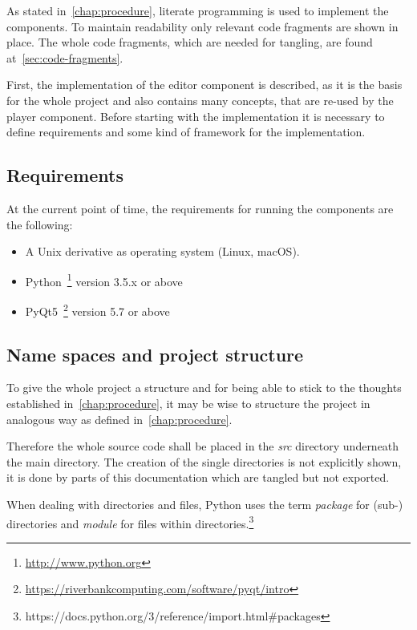 \documentclass[
    a4paper,      %
    10pt,         %
    openright,    %
    notitlepage,  %
    parskip=half, %
]{scrreprt}       %
\theoremstyle{definition}                    %
\begin{document}
As stated in~\autoref{chap:procedure}, literate programming is used to implement
the components. To maintain readability only relevant code fragments are shown
in place. The whole code fragments, which are needed for tangling, are found
at~\autoref{sec:code-fragments}.

First, the implementation of the editor component is described, as it is the
basis for the whole project and also contains many concepts, that are re-used by
the player component. Before starting with the implementation it is necessary to
define requirements and some kind of framework for the implementation.

\subsection{Requirements}
\label{subsec:appendix-requirements}

At the current point of time, the requirements for running the components are
the following:

\begin{itemize}
\item A Unix derivative as operating system (Linux, macOS).
\item Python~\footnote{\url{http://www.python.org}} version 3.5.x or above
\item PyQt5~\footnote{\url{https://riverbankcomputing.com/software/pyqt/intro}}
      version 5.7 or above
\end{itemize}

\subsection{Name spaces and project structure}
\label{subsec:appendix-name-spaces}

To give the whole project a structure and for being able to stick to the
thoughts established in~\autoref{chap:procedure}, it may be wise to structure
the project in analogous way as defined in~\autoref{chap:procedure}.

Therefore the whole source code shall be placed in the \textit{src} directory
underneath the main directory. The creation of the single directories is not
explicitly shown, it is done by parts of this documentation which are tangled
but not exported.

When dealing with directories and files, Python uses the term \textit{package} for
(sub-) directories and \textit{module} for files within
directories.\footnote{https://docs.python.org/3/reference/import.html\#packages}
\end{document}

